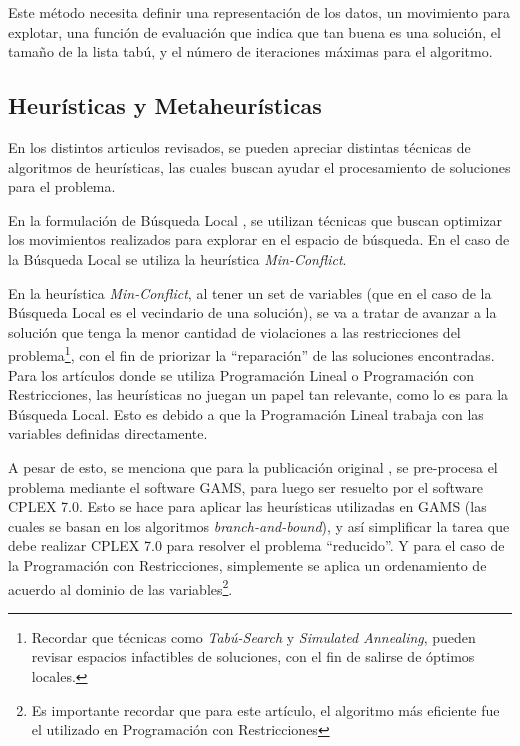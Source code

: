 \documentclass[letter, 10pt]{article}
\begin{document}
Este método necesita definir una representación de los datos, un movimiento para explotar, una función de evaluación que indica que tan buena es una solución, el tamaño de la lista tabú, y el número de iteraciones máximas para el algoritmo.

\subsection{Heurísticas y Metaheurísticas}
En los distintos articulos revisados, se pueden apreciar distintas técnicas de algoritmos de heurísticas, las cuales buscan ayudar el procesamiento de soluciones para el problema.

En la formulación de Búsqueda Local \cite{LocalSearch, PseudoLocal}, se utilizan técnicas que buscan optimizar los movimientos realizados para explorar en el espacio de búsqueda. En el caso de la Búsqueda Local se utiliza la heurística \textit{Min-Conflict}\cite{LocalSearch}.

En la heurística \textit{Min-Conflict}, al tener un set de variables (que en el caso de la Búsqueda Local es el vecindario de una solución), se va a tratar de avanzar a la solución que tenga la menor cantidad de violaciones a las restricciones del problema\footnote{Recordar que técnicas como \textit{Tabú-Search} y \textit{Simulated Annealing}, pueden revisar espacios infactibles de soluciones, con el fin de salirse de óptimos locales.}, con el fin de priorizar la ``reparación'' de las soluciones encontradas\cite{MinConflicts}.\\

Para los artículos donde se utiliza Programación Lineal o Programación con Restricciones, las heurísticas no juegan un papel tan relevante, como lo es para la Búsqueda Local. Esto es debido a que la Programación Lineal trabaja con las variables definidas directamente.

A pesar de esto, se menciona que para la publicación original \cite{FirstPublication}, se pre-procesa el problema mediante el software GAMS, para luego ser resuelto por el software CPLEX 7.0. Esto se hace para aplicar las heurísticas utilizadas en GAMS (las cuales se basan en los algoritmos \textit{branch-and-bound}), y así simplificar la tarea que debe realizar CPLEX 7.0 para resolver el problema ``reducido''. Y para el caso de la Programación con Restricciones, simplemente se aplica un ordenamiento de acuerdo al dominio de las variables\footnote{Es importante recordar que para este artículo, el algoritmo más eficiente fue el utilizado en Programación con Restricciones}.\\
\end{document}
